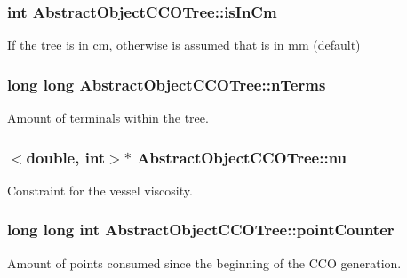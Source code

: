 \subsubsection[{\texorpdfstring{is\+In\+Cm}{isInCm}}]{\setlength{\rightskip}{0pt plus 5cm}int Abstract\+Object\+C\+C\+O\+Tree\+::is\+In\+Cm\hspace{0.3cm}{\ttfamily [protected]}}\hypertarget{class_abstract_object_c_c_o_tree_a11ab0fe8d03165bcbf23bc3cca75cafc}{}\label{class_abstract_object_c_c_o_tree_a11ab0fe8d03165bcbf23bc3cca75cafc}
If the tree is in cm, otherwise is assumed that is in mm (default) 
\subsubsection[{\texorpdfstring{n\+Terms}{nTerms}}]{\setlength{\rightskip}{0pt plus 5cm}long long Abstract\+Object\+C\+C\+O\+Tree\+::n\+Terms\hspace{0.3cm}{\ttfamily [protected]}}\hypertarget{class_abstract_object_c_c_o_tree_ad6c998c6ee999126718ca75cf7eeea0e}{}\label{class_abstract_object_c_c_o_tree_ad6c998c6ee999126718ca75cf7eeea0e}
Amount of terminals within the tree. 
\subsubsection[{\texorpdfstring{nu}{nu}}]{$<$double, int$>$$\ast$ Abstract\+Object\+C\+C\+O\+Tree\+::nu\hspace{0.3cm}{\ttfamily [protected]}}\hypertarget{class_abstract_object_c_c_o_tree_a92e6b6d1a2fac7331eee34fb28158828}{}\label{class_abstract_object_c_c_o_tree_a92e6b6d1a2fac7331eee34fb28158828}
Constraint for the vessel viscosity. 
\subsubsection[{\texorpdfstring{point\+Counter}{pointCounter}}]{\setlength{\rightskip}{0pt plus 5cm}long long int Abstract\+Object\+C\+C\+O\+Tree\+::point\+Counter\hspace{0.3cm}{\ttfamily [protected]}}\hypertarget{class_abstract_object_c_c_o_tree_a8d8512b976d31017c242e229dafebd0a}{}\label{class_abstract_object_c_c_o_tree_a8d8512b976d31017c242e229dafebd0a}
Amount of points consumed since the beginning of the C\+CO generation. 
